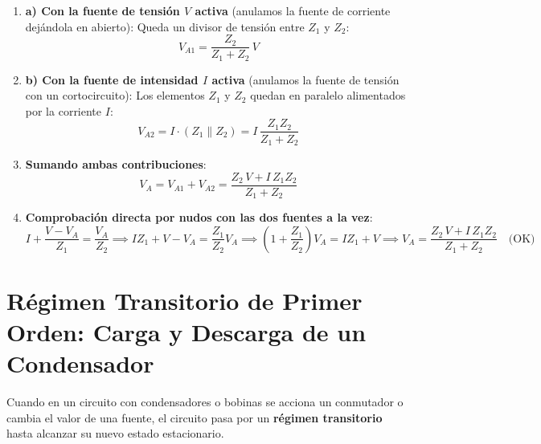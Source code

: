 \begin{ejemplo}
\begin{enumerate}
    \item \textbf{a) Con la fuente de tensión $V$ activa} (anulamos la fuente de corriente dejándola en abierto): Queda un divisor de tensión entre $Z_1$ y $Z_2$:
    \begin{equation*}
        V_{A1} = \frac{Z_2}{Z_1 + Z_2}\,V
    \end{equation*}
    \item \textbf{b) Con la fuente de intensidad $I$ activa} (anulamos la fuente de tensión con un cortocircuito): Los elementos $Z_1$ y $Z_2$ quedan en paralelo alimentados por la corriente $I$:
    \begin{equation*}
        V_{A2} = I\cdot (Z_1 \parallel Z_2) = I\,\frac{Z_1 Z_2}{Z_1 + Z_2}
    \end{equation*}
    \item \textbf{Sumando ambas contribuciones}:
    \begin{equation*}
        \boxed{V_A = V_{A1} + V_{A2} = \frac{Z_2\,V + I\,Z_1 Z_2}{Z_1 + Z_2}}
    \end{equation*}
    \item \textbf{Comprobación directa por nudos con las dos fuentes a la vez}:
    \begin{equation*}
        I + \frac{V - V_A}{Z_1} = \frac{V_A}{Z_2} \implies I Z_1 + V - V_A = \frac{Z_1}{Z_2}V_A \implies \left(1 + \frac{Z_1}{Z_2}\right)V_A = I Z_1 + V \implies V_A = \frac{Z_2\,V + I\,Z_1 Z_2}{Z_1 + Z_2} \quad \text{(OK)}
    \end{equation*}
\end{enumerate}
\end{ejemplo}

\section{Régimen Transitorio de Primer Orden: Carga y Descarga de un Condensador}

Cuando en un circuito con condensadores o bobinas se acciona un conmutador o cambia el valor de una fuente, el circuito pasa por un \textbf{régimen transitorio} hasta alcanzar su nuevo estado estacionario.

